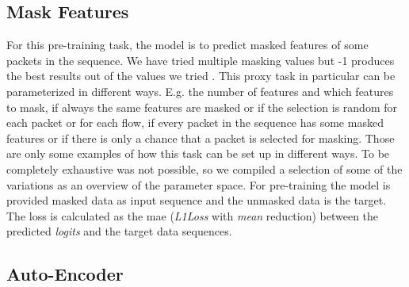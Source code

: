\subsection{Mask Features} \label{sec:experiments:lstm:mask_feature}

For this pre-training task, the model is to predict masked features of some packets in the sequence. We have tried multiple masking values but -1 produces the best results out of the values we tried . This proxy task in particular can be parameterized in different ways. E.g. the number of features and which features to mask, if always the same features are masked or if the selection is random for each packet or for each flow, if every packet in the sequence has some masked features or if there is only a chance that a packet is selected for masking. Those are only some examples of how this task can be set up in different ways. To be completely exhaustive was not possible, so we compiled a selection of some of the variations as an overview of the parameter space. For pre-training the model is provided masked data as input sequence and the unmasked data is the target. The loss is calculated as the \gls{mae} (\textit{L1Loss} with \textit{mean} reduction) between the predicted \textit{logits} and the target data sequences. 

\subsection{Auto-Encoder} \label{sec:experiments:lstm:auto_encoder}

